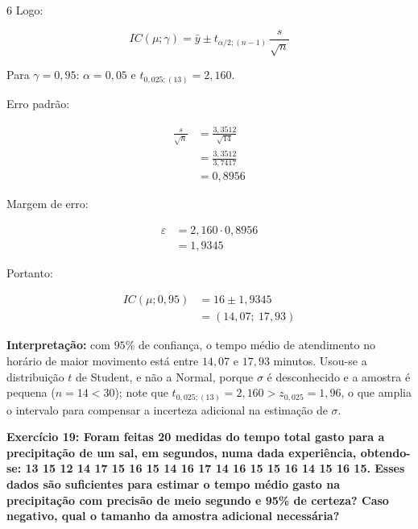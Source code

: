 \documentclass[8pt, a4paper, landscape]{extarticle}
\begin{document}
\begin{multicols}{6}
Logo:

\begin{equation*}
IC(\mu;\gamma) = \bar{y} \pm t_{\alpha/2;(n-1)}\,\frac{s}{\sqrt{n}}
\end{equation*}

Para $\gamma = 0,95$: $\alpha = 0,05$ e $t_{0,025;(13)} = 2,160$.

Erro padrão:

\begin{equation*}
\begin{split}
\frac{s}{\sqrt{n}} &= \frac{3,3512}{\sqrt{14}} \\
&= \frac{3,3512}{3,7417} \\
&= 0,8956
\end{split}
\end{equation*}

Margem de erro:

\begin{equation*}
\begin{split}
\varepsilon &= 2,160 \cdot 0,8956 \\
&= 1,9345
\end{split}
\end{equation*}

Portanto:

\begin{equation*}
\begin{split}
IC(\mu;0,95) &= 16 \pm 1,9345 \\
&= (14,07;\ 17,93)
\end{split}
\end{equation*}

\textbf{Interpretação:} com $95\%$ de confiança, o tempo médio de atendimento no horário de maior movimento está entre $14,07$ e $17,93$ minutos. Usou-se a distribuição $t$ de Student, e não a Normal, porque $\sigma$ é desconhecido e a amostra é pequena ($n = 14 < 30$); note que $t_{0,025;(13)} = 2,160 > z_{0,025} = 1,96$, o que amplia o intervalo para compensar a incerteza adicional na estimação de $\sigma$.

\textbf{Exercício 19: Foram feitas 20 medidas do tempo total gasto para a precipitação de um sal, em segundos, numa dada experiência, obtendo-se: 13 15 12 14 17 15 16 15 14 16 17 14 16 15 15 16 14 15 16 15. Esses dados são suficientes para estimar o tempo médio gasto na precipitação com precisão de meio segundo e 95\% de certeza? Caso negativo, qual o tamanho da amostra adicional necessária?}


\end{multicols}
\end{document}
